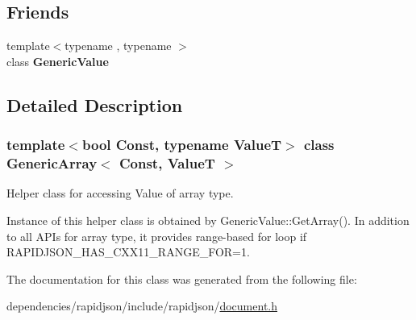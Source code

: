 \subsection*{Friends}
\begin{DoxyCompactItemize}
\item 
\mbox{\label{class_generic_array_a899449e1a645b5e377af059fb61113d8}} 
{\footnotesize template$<$typename , typename $>$ }\\class {\bfseries Generic\+Value}
\end{DoxyCompactItemize}


\subsection{Detailed Description}
\subsubsection*{template$<$bool Const, typename ValueT$>$\newline
class Generic\+Array$<$ Const, Value\+T $>$}

Helper class for accessing Value of array type. 

Instance of this helper class is obtained by {\ttfamily Generic\+Value\+::\+Get\+Array()}. In addition to all A\+P\+Is for array type, it provides range-\/based for loop if {\ttfamily R\+A\+P\+I\+D\+J\+S\+O\+N\+\_\+\+H\+A\+S\+\_\+\+C\+X\+X11\+\_\+\+R\+A\+N\+G\+E\+\_\+\+F\+OR=1}. 

The documentation for this class was generated from the following file\+:\begin{DoxyCompactItemize}
\item 
dependencies/rapidjson/include/rapidjson/\hyperlink{document_8h}{document.\+h}\end{DoxyCompactItemize}
